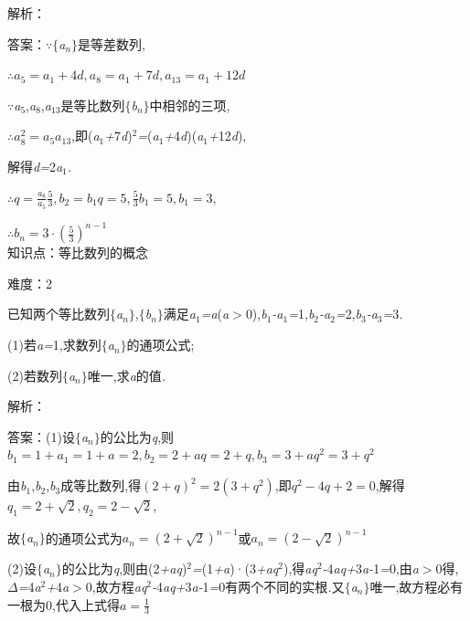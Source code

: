 \documentclass{article} %
\begin{document}
解析：

 答案：\textit{$\because$}$\mathrm{\{}$\textit{a${}_{n}$}$\mathrm{\}}$是等差数列,

$\therefore a_5=a_1+4d,a_8=a_1+7d,a_{13}=a_1+12d$

\textit{$\because$a}${}_{5}$,\textit{a}${}_{8}$,\textit{a}${}_{13}$是等比数列$\mathrm{\{}$\textit{b${}_{n}$}$\mathrm{\}}$中相邻的三项,

$\therefore a_8^2=a_5a_{13}$,即(\textit{a}${}_{1}$\textit{+}7\textit{d})${}^{2}$\textit{=}(\textit{a}${}_{1}$\textit{+}4\textit{d})(\textit{a}${}_{1}$\textit{+}12\textit{d}),

解得\textit{d=}2\textit{a}${}_{1}$\textit{.}

$\therefore q=\frac{a_8}{a_5}\frac{5}{3},b_2=b_1q=5,\frac{5}{3}b_1=5,b_1=3$,

$\therefore b_n=3\cdot (\frac{5}{3})^{n-1}$ \\

知识点：等比数列的概念

难度：2

 已知两个等比数列$\mathrm{\{}$\textit{a${}_{n}$}$\mathrm{\}}$,$\mathrm{\{}$\textit{b${}_{n}$}$\mathrm{\}}$满足\textit{a}${}_{1}$\textit{=a}(\textit{a$>$}0),\textit{b}${}_{1}$\textit{-a}${}_{1}$\textit{=}1,\textit{b}${}_{2}$\textit{-a}${}_{2}$\textit{=}2,\textit{b}${}_{3}$\textit{-a}${}_{3}$\textit{=}3\textit{.}

 (1)若\textit{a=}1,求数列$\mathrm{\{}$\textit{a${}_{n}$}$\mathrm{\}}$的通项公式;

 (2)若数列$\mathrm{\{}$\textit{a${}_{n}$}$\mathrm{\}}$唯一,求\textit{a}的值\textit{.}

解析：

 答案：(1)设$\mathrm{\{}$\textit{a${}_{n}$}$\mathrm{\}}$的公比为\textit{q},则$b_1=1+a_1=1+a=2,b_2=2+aq=2+q,b_3=3+aq^2=3+q^2$

由\textit{b}${}_{1}$,\textit{b}${}_{2}$,\textit{b}${}_{3}$成等比数列,得$(2+q)^2=2(3+q^2)$,即$q^2-4q+2=0$,解得$q_1=2+\sqrt{2},q_2=2-\sqrt{2}$,

故$\mathrm{\{}$\textit{a${}_{n}$}$\mathrm{\}}$的通项公式为$a_n=(2+\sqrt{2})^{n-1}$或$a_n=(2-\sqrt{2})^{n-1}$

(2)设$\mathrm{\{}$\textit{a${}_{n}$}$\mathrm{\}}$的公比为\textit{q},则由(2\textit{+aq})${}^{2}$\textit{=}(1\textit{+a})·(3\textit{+aq}${}^{2}$),得\textit{aq}${}^{2}$\textit{-}4\textit{aq+}3\textit{a-}1\textit{=}0,由\textit{a$>$}0得,$\Delta$\textit{=}4\textit{a}${}^{2}$\textit{+}4\textit{a$>$}0,故方程\textit{aq}${}^{2}$\textit{-}4\textit{aq+}3\textit{a-}1\textit{=}0有两个不同的实根\textit{.}又$\mathrm{\{}$\textit{a${}_{n}$}$\mathrm{\}}$唯一,故方程必有一根为0,代入上式得$a=\frac{1}{3}$ \\
\end{document}

